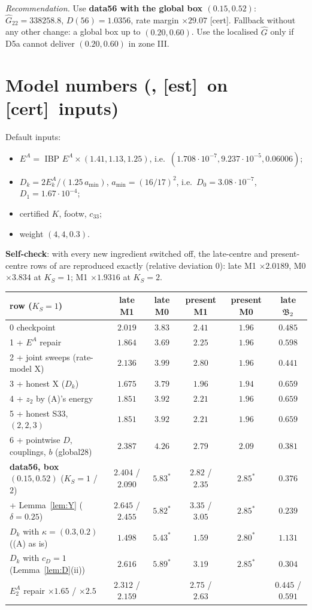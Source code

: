\documentclass[11pt]{article}
\theoremstyle{remark}\newtheorem{remark}[theorem]{Remark}
\newcommand{\fn}[1]{\texttt{\detokenize{#1}}}
\newcommand{\tC}{\textup{[cert]}}\newcommand{\tE}{\textup{[est]}}\newcommand{\tP}{\textup{[paper]}}\newcommand{\tR}{\textup{[rev]}}
\begin{document}
\emph{Recommendation.} Use \textbf{data56 with the global box $(0.15,0.52)$}: $\hat G_{22}=338258.8$, $D(56)=1.0356$, rate margin $\times29.07$ \tC. Fallback without any other change: a global box up to $(0.20,0.60)$. Use the localised $\hat G$ only if D5a cannot deliver $(0.20,0.60)$ in zone III.

\section{Model numbers (\fn{U_model2.py}, \tE\ on \tC\ inputs)}\label{sec:num}
Default inputs:
\begin{itemize}[leftmargin=*,itemsep=0pt]
\item $E^A=$ IBP $E^A\times(1.41,1.13,1.25)$, i.e.\ $(1.708\cdot10^{-7},9.237\cdot10^{-5},0.06006)$;
\item $D_k=2E^A_k/(1.25\,a_{\min})$, $a_{\min}=(16/17)^2$, i.e.\ $D_0=3.08\cdot10^{-7}$, $D_1=1.67\cdot10^{-4}$;
\item certified $K$, footw, $c_{33}$;
\item weight $(4,4,0.3)$.
\end{itemize}
\textbf{Self-check}: with every new ingredient switched off, the late-centre and present-centre rows of \fn{t1_checkpoint.json} are reproduced exactly (relative deviation $0$): late M1 $\times2.0189$, M0 $\times3.834$ at $K_S=1$; M1 $\times1.9316$ at $K_S=2$.
\begin{center}\small\begin{tabular}{@{}lccccc@{}}\toprule
row ($K_S=1$) & late M1 & late M0 & present M1 & present M0 & late $\mathfrak B_2$\\\midrule
0 checkpoint & $2.019$ & $3.83$ & $2.41$ & $1.96$ & $0.485$\\
1 + $E^A$ repair & $1.864$ & $3.69$ & $2.25$ & $1.96$ & $0.598$\\
2 + joint sweeps (rate-model X) & $2.136$ & $3.99$ & $2.80$ & $1.96$ & $0.441$\\
3 + honest X ($D_k$) & $1.675$ & $3.79$ & $1.96$ & $1.94$ & $0.659$\\
4 + $z_2$ by (A)'s energy & $1.851$ & $3.92$ & $2.21$ & $1.96$ & $0.659$\\
5 + honest S33, $(2,2,3)$ & $1.851$ & $3.92$ & $2.21$ & $1.96$ & $0.659$\\
6 + pointwise $D$, couplings, $b$ (global28) & $2.387$ & $4.26$ & $2.79$ & $2.09$ & $0.381$\\
\textbf{data56, box $(0.15,0.52)$} ($K_S=1$ / $2$) & $\mathbf{2.404}$ / $2.090$ & $5.83^\ast$ & $2.82$ / $2.35$ & $2.85^\ast$ & $0.376$\\
\quad + Lemma~\ref{lem:Y} ($\delta=0.25$) & $2.645$ / $2.455$ & $5.82^\ast$ & $3.35$ / $3.05$ & $2.85^\ast$ & $0.239$\\
\quad $D_k$ with $\kappa=(0.3,0.2)$ ((A) as is) & $1.498$ & $5.43^\ast$ & $1.59$ & $2.80^\ast$ & $1.131$\\
\quad $D_k$ with $c_D=1$ (Lemma~\ref{lem:D}(ii)) & $2.616$ & $5.89^\ast$ & $3.19$ & $2.85^\ast$ & $0.304$\\
\quad $E^A_2$ repair $\times1.65$ / $\times2.5$ & $2.312$ / $2.159$ & & $2.75$ / $2.63$ & & $0.445$ / $0.591$\\\bottomrule
\end{tabular}\end{center}
\end{document}
